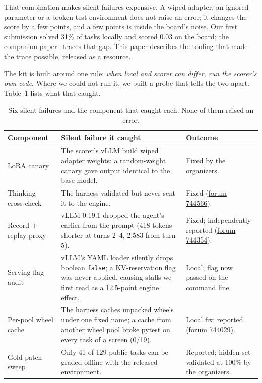 \documentclass[11pt]{article}
\newcommand{\forum}[1]{\href{https://www.kaggle.com/competitions/gemma-4-developer-agent/discussion/#1}{forum #1}}
\newcommand{\tool}[1]{\texttt{\detokenize{#1}}}
\begin{document}
That combination makes silent failures expensive. A wiped adapter, an ignored parameter or a broken test environment does not raise an error; it changes the score by a few points, and a few points is inside the board's noise. Our first submission solved 31\% of tasks locally and scored 0.03 on the board; the companion paper~\citep{runtimebound2026} traces that gap. This paper describes the tooling that made the trace possible, released as a resource.

The kit is built around one rule: \emph{when local and scorer can differ, run the scorer's own code}. Where we could not run it, we built a probe that tells the two apart. Table~\ref{tab:caught} lists what that caught.

\begin{table}[!htb]
\centering\footnotesize
\begin{tabularx}{\linewidth}{>{\raggedright\arraybackslash}p{2.9cm}X>{\raggedright\arraybackslash}p{3.0cm}}
\toprule
Component & Silent failure it caught & Outcome \\
\midrule
LoRA canary & The scorer's vLLM build wiped adapter weights: a random-weight canary gave output identical to the base model. & Fixed by the organizers. \\
Thinking cross-check & The harness validated \tool{thinking_budget} but never sent it to the engine. & Fixed (\forum{744566}). \\
Record + replay proxy & vLLM 0.19.1 dropped the agent's earlier \tool{reasoning_content} from the prompt (418 tokens shorter at turns 2--4, 2,583 from turn 5). & Fixed; independently reported (\forum{744354}). \\
Serving-flag audit & vLLM's YAML loader silently drops boolean \texttt{false}; a KV-reservation flag was never applied, causing stalls we first read as a 12.5-point engine effect. & Local; flag now passed on the command line. \\
Per-pool wheel cache & The harness caches unpacked wheels under one fixed name; a cache from another wheel pool broke pytest on every task of a screen (0/19). & Local fix; reported (\forum{744029}). \\
Gold-patch sweep & Only 41 of 129 public tasks can be graded offline with the released environment. & Reported; hidden set validated at 100\% by the organizers. \\
\bottomrule
\end{tabularx}
\caption{Six silent failures and the component that caught each. None of them raised an error.}
\label{tab:caught}
\end{table}
\end{document}
